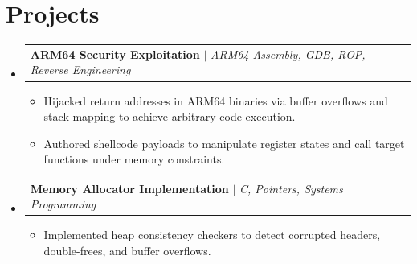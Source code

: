 \documentclass[letterpaper,11pt]{article}
\makeatletter
\newcommand{\resumeItem}[1]{
  \item\small{
    {#1 \vspace{-2pt}}
  }
}
\newcommand{\resumeProjectHeading}[2]{
    \item
    \begin{tabular*}{0.97\textwidth}{l@{\extracolsep{\fill}}r}
      \small#1 & #2 \\
    \end{tabular*}\vspace{-7pt}
}
\newcommand{\resumeSubHeadingListStart}{\begin{itemize}[leftmargin=0.15in, label={}]}
\newcommand{\resumeSubHeadingListEnd}{\end{itemize}}
\newcommand{\resumeItemListStart}{\begin{itemize}[leftmargin=0.2in]}
\newcommand{\resumeItemListEnd}{\end{itemize}\vspace{-5pt}}
\makeatother
\begin{document}
\section{Projects}
\resumeSubHeadingListStart

    \resumeProjectHeading
      {\textbf{ARM64 Security Exploitation} $|$ \emph{ARM64 Assembly, GDB, ROP, Reverse Engineering}}{}
      \resumeItemListStart
        \resumeItem{Hijacked return addresses in ARM64 binaries via buffer overflows and stack mapping to achieve arbitrary code execution.}
        \resumeItem{Authored shellcode payloads to manipulate register states and call target functions under memory constraints.}
      \resumeItemListEnd

    \resumeProjectHeading
      {\textbf{Memory Allocator Implementation} $|$ \emph{C, Pointers, Systems Programming}}{}
      \resumeItemListStart
        \resumeItem{Implemented heap consistency checkers to detect corrupted headers, double-frees, and buffer overflows.}
      \resumeItemListEnd

\resumeSubHeadingListEnd
\end{document}
